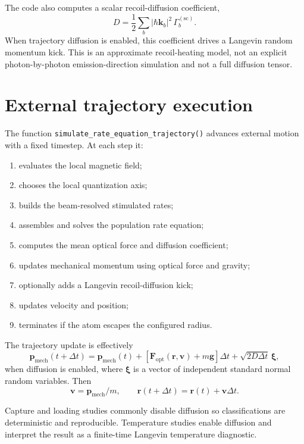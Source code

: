 \documentclass[11pt]{article}
\begin{document}
The code also computes a scalar recoil-diffusion coefficient,
\[
    D
    =
    \frac{1}{2}
    \sum_b
    |\hbar\mathbf k_b|^2\,
    \Gamma_b^{(\mathrm{sc})}.
\]
When trajectory diffusion is enabled, this coefficient drives a Langevin random
momentum kick.  This is an approximate recoil-heating model, not an explicit
photon-by-photon emission-direction simulation and not a full diffusion tensor.

\section{External trajectory execution}

The function \texttt{simulate\_rate\_equation\_trajectory()} advances external
motion with a fixed timestep.  At each step it:
\begin{enumerate}[nosep]
    \item evaluates the local magnetic field;
    \item chooses the local quantization axis;
    \item builds the beam-resolved stimulated rates;
    \item assembles and solves the population rate equation;
    \item computes the mean optical force and diffusion coefficient;
    \item updates mechanical momentum using optical force and gravity;
    \item optionally adds a Langevin recoil-diffusion kick;
    \item updates velocity and position;
    \item terminates if the atom escapes the configured radius.
\end{enumerate}

The trajectory update is effectively
\[
    \mathbf p_{\mathrm{mech}}(t+\Delta t)
    =
    \mathbf p_{\mathrm{mech}}(t)
    +
    \left[\mathbf F_{\mathrm{opt}}(\mathbf r,\mathbf v)
    + m\mathbf g\right]\Delta t
    +
    \sqrt{2D\Delta t}\,\boldsymbol\xi,
\]
when diffusion is enabled, where \(\boldsymbol\xi\) is a vector of independent
standard normal random variables.  Then
\[
    \mathbf v = \mathbf p_{\mathrm{mech}}/m,
    \qquad
    \mathbf r(t+\Delta t)=\mathbf r(t)+\mathbf v\Delta t.
\]

Capture and loading studies commonly disable diffusion so classifications are
deterministic and reproducible.  Temperature studies enable diffusion and
interpret the result as a finite-time Langevin temperature diagnostic.
\end{document}
